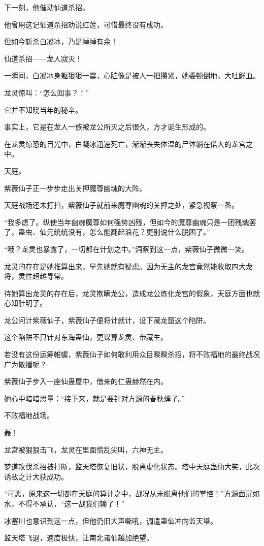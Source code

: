 \begin{this_body}
下一刻，他催动仙道杀招。

他曾用这记仙道杀招劝说红莲，可惜最终没有成功。

但如今斩杀白凝冰，乃是绰绰有余！

仙道杀招——龙人寂灭！

一瞬间，白凝冰身躯狠狠一震，心脏像是被人一把攥紧，她委顿倒地，大吐鲜血。

龙灵惊叫：“怎么回事？！”

它并不知晓当年的秘辛。

事实上，它是在龙人一族被龙公所灭之后很久，方才诞生形成的。

在龙灵惊恐的目光中，白凝冰迅速死亡，渐渐丧失体温的尸体躺在偌大的龙宫之中。

天庭。

紫薇仙子正一步步走出关押魔尊幽魂的大阵。

天庭战场还未打扫，紫薇仙子就前来魔尊幽魂的关押之处，紧急视察一番。

“我多虑了。纵使当年幽魂魔尊如何强势凶残，但如今的魔尊幽魂只是一团残魂罢了，蛊虫、仙元统统没有，怎么能翻起浪花？更别说什么脱困了。”

“哦？龙灵也暴露了，一切都在计划之中。”洞察到这一点，紫薇仙子微微一笑。

龙灵的存在是她推算出来，早先她就有疑虑。因为无主的龙宫竟然能收取四大龙将，灵性超越寻常。

待她算出龙灵的存在后，龙灵欺瞒龙公，造成龙公炼化龙宫的假象，天庭方面也就心知肚明了。

龙公问计紫薇仙子，紫薇仙子便将计就计，设下藏龙窟这个陷阱。

这个陷阱不只针对东海蛊仙，更谋算龙灵、帝藏生。

若没有这份运筹帷幄，紫薇仙子如何敢利用众目睽睽杀招，将不败福地的最终战况广为散播呢？

紫薇仙子步入一座仙蛊屋中，借来的仁蛊赫然在内。

她心中暗暗思量：“接下来，就是要针对方源的春秋蝉了。”

不败福地战场。

轰！

龙宫被狠狠击飞，龙灵在里面慌乱尖叫，六神无主。

梦道攻伐杀招被打断，监天塔恢复旧状，脱离虚化状态。塔中天庭蛊仙大笑，此次诱敌之计大获成功。

“可恶，原来这一切都在天庭的算计之中，战况从未脱离他们的掌控！”方源面沉如水，不得不承认，“这一战我们输了！”

冰塞川也意识到这一点，但他仍旧大声嘶吼，调遣蛊仙冲向监天塔。

监天塔飞退，速度极快，让南北诸仙越加绝望。


\end{this_body}
